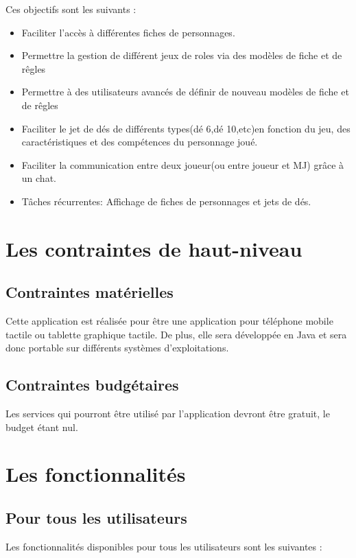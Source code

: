 \documentclass[11pt,a4paper]{article}
\begin{document}
Ces objectifs sont les suivants :

\begin{itemize}
  \item Faciliter l'accès à différentes fiches de personnages.
	\item Permettre la gestion de différent jeux de roles via des modèles de fiche et de rêgles
\item Permettre à des utilisateurs avancés de définir de nouveau modèles de fiche et de rêgles
  \item Faciliter le jet de dés de différents types(dé 6,dé 10,etc)en fonction
  du jeu, des caractéristiques et des compétences du personnage joué.
  \item Faciliter la communication entre deux joueur(ou entre joueur et MJ)
  grâce à un chat.
  \item Tâches récurrentes: Affichage de fiches de personnages et jets de dés.
\end{itemize}

\clearpage

\section{Les contraintes de haut-niveau}
\subsection{Contraintes matérielles}

Cette application est réalisée pour être une application pour téléphone mobile
tactile ou tablette graphique tactile. De plus, elle sera développée en Java et
sera donc portable sur différents systèmes d'exploitations.

\subsection{Contraintes budgétaires}

Les services qui pourront être utilisé par l'application devront être gratuit, le budget étant nul.

\section{Les fonctionnalités}

\subsection{Pour tous les utilisateurs}
Les fonctionnalités disponibles pour tous les utilisateurs sont les suivantes :
\end{document}
